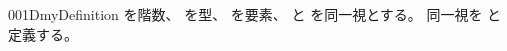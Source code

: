 \documentclass[index]{subfiles}
\begin{document}
\begin{myBlock}{001D}{myDefinition}
  を階数、
  を型、
  を要素、
  と
  を同一視とする。
  同一視を
  と定義する。
\end{myBlock}
\end{document}
